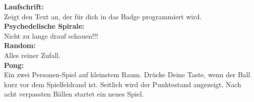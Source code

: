 \documentclass{article}
\begin{document}
\textbf{Laufschrift:}\\
Zeigt den Text an, der für dich in das Badge programmiert wird.\\

\textbf{Psychedelische Spirale:}\\
Nicht zu lange drauf schauen!!!\\

\textbf{Random:}\\
Alles reiner Zufall.\\

\textbf{Pong:}\\
Ein zwei Personen-Spiel auf kleinstem Raum. Drücke Deine Taste, wenn der Ball kurz vor dem Spielfeldrand ist. Seitlich wird der Punktestand angezeigt. Nach acht verpassten Bällen startet ein neues Spiel.\\





\end{document}
